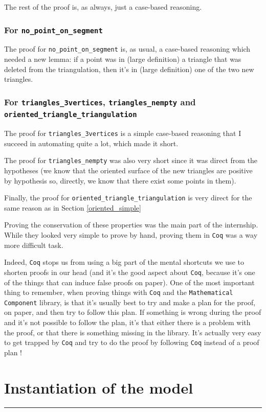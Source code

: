 \documentclass[a4paper,10pt]{article}
\begin{document}
The rest of the proof is, as always, just a case-based reasoning.

\subsubsection{For {\tt no\_point\_on\_segment}}
The proof for {\tt no\_point\_on\_segment} is, as usual, a case-based reasoning which needed a new lemma: if a point was in (large definition) a triangle that was deleted from the triangulation, then it's in (large definition) one of the two new triangles.

\subsubsection{For {\tt triangles\_3vertices}, {\tt triangles\_nempty} and {\tt oriented\_triangle\_triangulation}}
The proof for {\tt triangles\_3vertices} is a simple case-based reasoning that I succeed in automating quite a lot, which made it short.

The proof for {\tt triangles\_nempty} was also very short since it was direct from the hypotheses (we know that the oriented surface of the new triangles are positive by hypothesis so, directly, we know that there exist some points in them).

Finally, the proof for {\tt oriented\_triangle\_triangulation} is very direct for the same reason as in Section \ref{oriented_simple}

Proving the conservation of these properties was the main part of the internship. While they looked very simple to prove by hand, proving them in {\tt Coq} was a way more difficult task.

Indeed, {\tt Coq} stops us from using a big part of the mental shortcuts we use to shorten proofs in our head (and it's the good aspect about {\tt Coq}, because it's one of the things that can induce false proofs on paper). One of the most important thing to remember, when proving things with {\tt Coq} and the {\tt Mathematical Component} library, is that it's usually best to try and make a plan for the proof, on paper, and then try to follow this plan.  If something is wrong during the proof and it's not possible to follow the plan, it's that either there is a problem with the proof, or that there is something missing in the library. It's actually very easy to get trapped by {\tt Coq} and try to do the proof by following {\tt Coq} instead of a proof plan !

\section{Instantiation of the model}
\rule{\linewidth}{0.5pt}
\end{document}
